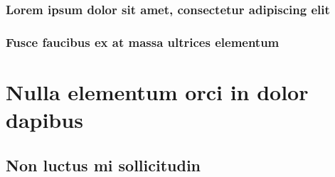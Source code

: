 \subsubsection{Lorem ipsum dolor sit amet, consectetur adipiscing elit}

\lipsum[77] 

\subsubsection{Fusce faucibus ex at massa ultrices elementum}

\lipsum[78] 
\newpage

\section{Nulla elementum orci in dolor dapibus}

\lipsum[79] 

\subsection{Non luctus mi sollicitudin}

\lipsum[80-82] 

\newpage 

